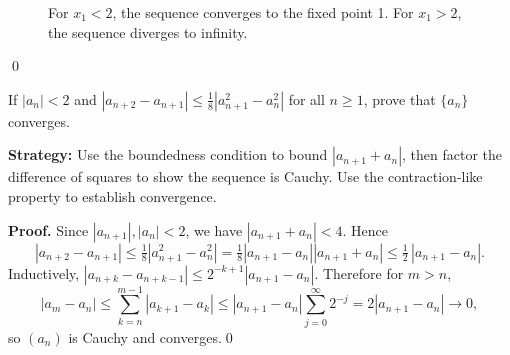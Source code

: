 \begin{figure}[h]
\centering
{}
\caption{For $x_1 < 2$, the sequence converges to the fixed point 1. For $x_1 > 2$, the sequence diverges to infinity.}
\end{figure}\qed



\begin{problembox}
\begin{problemstatement}
If $|a_n| < 2$ and $|a_{n+2} - a_{n+1}| \leq \frac{1}{8} |a_{n+1}^2 - a_n^2|$ for all $n \geq 1$, prove that $\{a_n\}$ converges.
\end{problemstatement}
\end{problembox}

\noindent\textbf{Strategy:} Use the boundedness condition to bound $|a_{n+1} + a_n|$, then factor the difference of squares to show the sequence is Cauchy. Use the contraction-like property to establish convergence.

\noindent\textbf{Proof.}
Since $|a_{n+1}|,|a_n|<2$, we have $|a_{n+1}+a_n|<4$. Hence
\[
|a_{n+2}-a_{n+1}|\le\tfrac18|a_{n+1}^2-a_n^2|=\tfrac18|a_{n+1}-a_n||a_{n+1}+a_n|
\le \tfrac12\,|a_{n+1}-a_n|.
\]
Inductively, $|a_{n+k}-a_{n+k-1}|\le 2^{-k+1}|a_{n+1}-a_n|$. Therefore for $m>n$,
\[
|a_m-a_n|\le \sum_{k=n}^{m-1}|a_{k+1}-a_k|\le |a_{n+1}-a_n|\sum_{j=0}^{\infty}2^{-j}=2|a_{n+1}-a_n|\to 0,
\]
so $(a_n)$ is Cauchy and converges.\qed
\medskip



